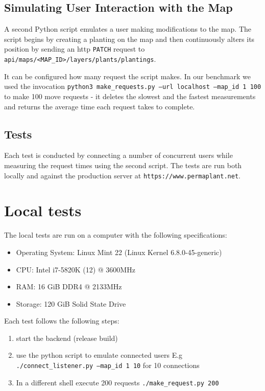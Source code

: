 \documentclass[final,draft,oneside]{vutinfth}
\begin{document}
\subsection{Simulating User Interaction with the Map}
A second Python script emulates a user making modifications to the map.
The script begins by creating a planting on the map and then continuously alters its position by sending an \gls{http} \texttt{PATCH} request to \texttt{api/maps/<MAP\_ID>/layers/plants/plantings}.

It can be configured how many request the script makes.
In our benchmark we used the invocation \texttt{python3 make\_requests.py --url localhost --map\_id 1 100} to make
100 move requests - it deletes the slowest and the fastest measurements and returns the average time each request takes to complete.

\subsection{Tests}

Each test is conducted by connecting a number of concurrent users while measuring the request times using the second script. The tests are run both locally and against the production server at \texttt{https://www.permaplant.net}.

\section{Local tests}

The local tests are run on a computer with the following specifications:
\begin{itemize}
  \item Operating System: Linux Mint 22 (Linux Kernel 6.8.0-45-generic)
  \item CPU: Intel i7-5820K (12) @ 3600MHz
  \item RAM: 16 GiB DDR4 @ 2133MHz
  \item Storage: 120 GiB Solid State Drive
\end{itemize}

Each test follows the following steps:
\begin{enumerate}
    \item start the backend (release build)
    \item use the python script to emulate connected users
    E.g \texttt{./connect\_listener.py --map\_id 1 10} for 10 connections
    \item In a different shell execute 200 requests \texttt{./make\_request.py 200}
\end{enumerate}
\end{document}
